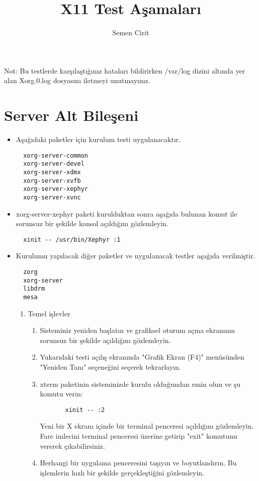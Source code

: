 \documentclass[a4paper,10pt]{article}
\title{X11 Test Aşamaları}
\author{Semen Cirit}
\begin{document}
\maketitle

Not: Bu testlerde karşılaştığınız hataları bildirirken /var/log dizini altında yer alan Xorg.0.log
dosyasını iletmeyi unutmayınız.

\section{Server Alt Bileşeni}

\begin{itemize}
  \item Aşağıdaki paketler için kurulum testi uygulanacaktır.
  \begin{verbatim}
  xorg-server-common
  xorg-server-devel
  xorg-server-xdmx
  xorg-server-xvfb
  xorg-server-xephyr
  xorg-server-xvnc
  \end{verbatim}

  \item xorg-server-xephyr paketi kurulduktan sonra aşağıda bulunan komut ile sorunsuz bir şekilde konsol
  açıldığını gözlemleyin.
  \begin{verbatim}
  xinit -- /usr/bin/Xephyr :1
  \end{verbatim}

  \item Kurulumu yapılacak diğer paketler ve uygulanacak testler aşağıda verilmiştir.
  \begin{verbatim}
  zorg    
  xorg-server
  libdrm
  mesa
  \end{verbatim}


  \begin{enumerate}
  \item Temel işlevler
    \begin{enumerate}
    \item Sisteminiz yeniden başlatın ve grafiksel oturum açma ekranının sorunsuz bir şekilde açıldığını gözlemleyin.
    \item Yukarıdaki testi açılış ekranında "Grafik Ekran (F4)" menüsünden "Yeniden Tanı" seçeneğini seçerek tekrarlayın.
    \item xterm paketinin sisteminizde kurulu olduğundan emin olun ve şu komutu verin:
      \begin{verbatim}
       xinit -- :2
      \end{verbatim}
      Yeni bir X ekranı içinde bir terminal penceresi açıldığını gözlemleyin. Fare imlecini terminal penceresi üzerine getirip "exit" komutunu vererek çıkabilirsiniz.
    \item Herhangi bir uygulama penceresini taşıyın ve boyutlandırın. Bu işlemlerin hızlı bir şekilde gerçekleştiğini gözlemleyin.
    \end{enumerate}


\end{enumerate}
\end{itemize}
\end{document}
